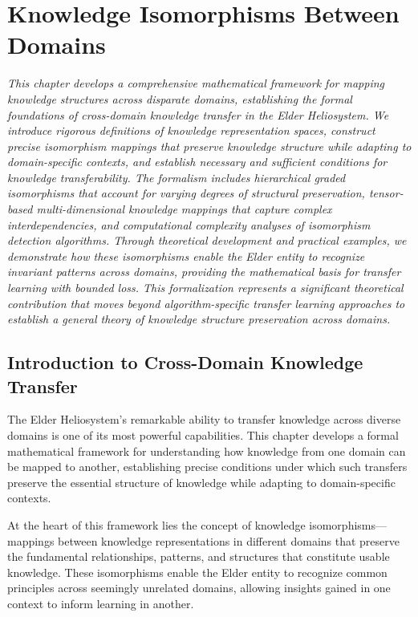 \chapter{Knowledge Isomorphisms Between Domains}

\textit{This chapter develops a comprehensive mathematical framework for mapping knowledge structures across disparate domains, establishing the formal foundations of cross-domain knowledge transfer in the Elder Heliosystem. We introduce rigorous definitions of knowledge representation spaces, construct precise isomorphism mappings that preserve knowledge structure while adapting to domain-specific contexts, and establish necessary and sufficient conditions for knowledge transferability. The formalism includes hierarchical graded isomorphisms that account for varying degrees of structural preservation, tensor-based multi-dimensional knowledge mappings that capture complex interdependencies, and computational complexity analyses of isomorphism detection algorithms. Through theoretical development and practical examples, we demonstrate how these isomorphisms enable the Elder entity to recognize invariant patterns across domains, providing the mathematical basis for transfer learning with bounded loss. This formalization represents a significant theoretical contribution that moves beyond algorithm-specific transfer learning approaches to establish a general theory of knowledge structure preservation across domains.}

\section{Introduction to Cross-Domain Knowledge Transfer}

The Elder Heliosystem's remarkable ability to transfer knowledge across diverse domains is one of its most powerful capabilities. This chapter develops a formal mathematical framework for understanding how knowledge from one domain can be mapped to another, establishing precise conditions under which such transfers preserve the essential structure of knowledge while adapting to domain-specific contexts.

At the heart of this framework lies the concept of knowledge isomorphisms—mappings between knowledge representations in different domains that preserve the fundamental relationships, patterns, and structures that constitute usable knowledge. These isomorphisms enable the Elder entity to recognize common principles across seemingly unrelated domains, allowing insights gained in one context to inform learning in another.

